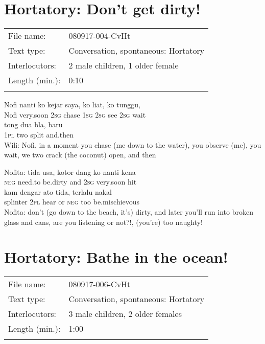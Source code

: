 \section{Hortatory: Don’t get dirty!}
\label{Para_B.9}
\begin{tabular}{ll}
\lsptoprule
File name: &  080917-004-CvHt\\
Text type: &  Conversation, spontaneous: Hortatory\\
Interlocutors: &  2 male children,\footnotemark{} 1 older female\\
Length (min.): &  0:10\\
\lspbottomrule
\end{tabular}
\setcounter{equation}{0}

\ea
{}    {Nofi}    {nanti}   ko   kejar   saya,   ko   liat,   ko   tunggu,\\
   {}    {Nofi}    {very.soon}   \textsc{2sg}   chase   \textsc{1sg}   \textsc{2sg}   see   \textsc{2sg}   wait\\
\gll tong    {dua}    {bla,}    {baru}\\
  \textsc{1pl}    {two}    {split}    {and.then}\\
\glt
Wili: Nofi, in a moment you chase (me down to the water), you observe (me), you wait, we two crack (the coconut) open, and then
\z

\ea
\gll   Nofita:    {tida}    {usa,}    {kotor}    {dang}    {ko}   nanti   kena\\
{} {\textsc{neg}}    {need.to}    {be.dirty}    {and}    {\textsc{2sg}}   very.soon   hit\\
    {kam}    {dengar}   ato    {tida,}    {terlalu}    {nakal}\\
   {splinter}    {\textsc{2pl}}    {hear}   or    {\textsc{neg}}    {too}    {be.mischievous}\\
\glt
Nofita: don’t (go down to the beach, it’s) dirty, and later you’ll run into broken glass and cans, are you listening or not?!, (you’re) too naughty!
\z %

\section{Hortatory: Bathe in the ocean!}
\label{Para_B.10}
\begin{tabular}{ll}
\lsptoprule
File name: &  080917-006-CvHt\\
Text type: &  Conversation, spontaneous: Hortatory\\
Interlocutors: &  3 male children,\footnotemark{} 2 older females\\
Length (min.): &  1:00\\
\lspbottomrule
\end{tabular}
\setcounter{equation}{0}

